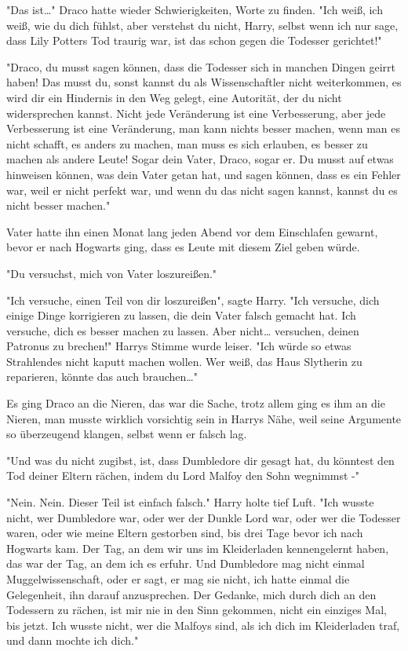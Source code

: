 {"Das ist…" Draco hatte wieder Schwierigkeiten, Worte zu finden. "Ich weiß, ich weiß, wie du dich fühlst, aber verstehst du nicht, Harry, selbst wenn ich nur sage, dass Lily Potters Tod traurig war, ist das schon gegen die Todesser gerichtet!"

"Draco, du musst sagen können, dass die Todesser sich in manchen Dingen geirrt haben! Das musst du, sonst kannst du als Wissenschaftler nicht weiterkommen, es wird dir ein Hindernis in den Weg gelegt, eine Autorität, der du nicht widersprechen kannst. Nicht jede Veränderung ist eine Verbesserung, aber jede Verbesserung ist eine Veränderung, man kann nichts besser machen, wenn man es nicht schafft, es anders zu machen, man muss es sich erlauben, es besser zu machen als andere Leute! Sogar dein Vater, Draco, sogar er. Du musst auf etwas hinweisen können, was dein Vater getan hat, und sagen können, dass es ein Fehler war, weil er nicht perfekt war, und wenn du das nicht sagen kannst, kannst du es nicht besser machen."

Vater hatte ihn einen Monat lang jeden Abend vor dem Einschlafen gewarnt, bevor er nach Hogwarts ging, dass es Leute mit diesem Ziel geben würde.

"Du versuchst, mich von Vater loszureißen."

"Ich versuche, einen Teil von dir loszureißen", sagte Harry. "Ich versuche, dich einige Dinge korrigieren zu lassen, die dein Vater falsch gemacht hat. Ich versuche, dich es besser machen zu lassen. Aber nicht… versuchen, deinen Patronus zu brechen!" Harrys Stimme wurde leiser. "Ich würde so etwas Strahlendes nicht kaputt machen wollen. Wer weiß, das Haus Slytherin zu reparieren, könnte das auch brauchen…"

Es ging Draco an die Nieren, das war die Sache, trotz allem ging es ihm an die Nieren, man musste wirklich vorsichtig sein in Harrys Nähe, weil seine Argumente so überzeugend klangen, selbst wenn er falsch lag.

"Und was du nicht zugibst, ist, dass Dumbledore dir gesagt hat, du könntest den Tod deiner Eltern rächen, indem du Lord Malfoy den Sohn wegnimmst -"

"Nein. Nein. Dieser Teil ist einfach falsch." Harry holte tief Luft. "Ich wusste nicht, wer Dumbledore war, oder wer der Dunkle Lord war, oder wer die Todesser waren, oder wie meine Eltern gestorben sind, bis drei Tage bevor ich nach Hogwarts kam. Der Tag, an dem wir uns im Kleiderladen kennengelernt haben, das war der Tag, an dem ich es erfuhr. Und Dumbledore mag nicht einmal Muggelwissenschaft, oder er sagt, er mag sie nicht, ich hatte einmal die Gelegenheit, ihn darauf anzusprechen. Der Gedanke, mich durch dich an den Todessern zu rächen, ist mir nie in den Sinn gekommen, nicht ein einziges Mal, bis jetzt. Ich wusste nicht, wer die Malfoys sind, als ich dich im Kleiderladen traf, und dann mochte ich dich."

}
